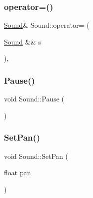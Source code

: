 \mbox{\label{class_sound_ae017eacf4168fc0d4d471f5768985ae2}} 
\subsubsection{\texorpdfstring{operator=()}{operator=()}\hspace{0.1cm}{\footnotesize\ttfamily [2/2]}}
{\footnotesize\ttfamily \mbox{\hyperlink{class_sound}{Sound}}\& Sound\+::operator= (\begin{DoxyParamCaption}\item[{\mbox{\hyperlink{class_sound}{Sound}} \&\&}]{s }\end{DoxyParamCaption})\hspace{0.3cm}{\ttfamily [inline]}, {\ttfamily [noexcept]}}

\mbox{\label{class_sound_a4e199b4346519a4977fe94998c4a77e7}} 
\subsubsection{\texorpdfstring{Pause()}{Pause()}}
{\footnotesize\ttfamily void Sound\+::\+Pause (\begin{DoxyParamCaption}{ }\end{DoxyParamCaption})\hspace{0.3cm}{\ttfamily [inline]}}

\mbox{\label{class_sound_a1b066e78405656b1475849139ca24dce}} 
\subsubsection{\texorpdfstring{Set\+Pan()}{SetPan()}}
{\footnotesize\ttfamily void Sound\+::\+Set\+Pan (\begin{DoxyParamCaption}\item[{float}]{pan }\end{DoxyParamCaption})\hspace{0.3cm}{\ttfamily [inline]}}

\mbox{\label{class_sound_a06b9680efb2b6b41b52d9f25ac0264f1}} 
